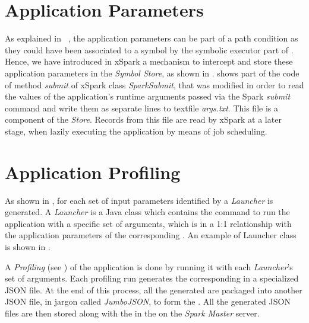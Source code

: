 \section{Application Parameters}\label{sec:application_parameters}
As explained in ~, the application parameters can be part of a path condition as they could have been associated to a symbol by the symbolic executor part of \dSymb. Hence, we have introduced in xSpark a mechanism to intercept and store these application parameters in the \tool \textit{Symbol Store}, as shown in .   shows part of the code of method \textit{submit} of xSpark class \textit{SparkSubmit}, that was modified in order to read the values of the application's runtime arguments passed via the Spark \textit{submit} command and write them as separate lines to textfile \textit{args.txt}. This file is a component of the \textit{\model Store}. Records from this file are read by xSpark at a later stage, when lazily executing the application by means of job scheduling.
 


\section{Application Profiling}\label{sec:application_profiling}
As shown in , for each set of input parameters identified by \dSymb a \textit{Launcher} is generated. A \textit{Launcher} is a Java class which contains the command to run the application with a specific set of arguments, which is in a 1:1 relationship with the application parameters of the corresponding \plan. An example of Launcher class is shown in . 

A \textit{Profiling} (see 
) of the application is done by running it with each \textit{Launcher}'s set of arguments. Each profiling run generates the corresponding \plan in a specialized JSON file. At the end of this process, all the generated \plans are packaged into another JSON file, in jargon called \textit{JumboJSON}, to form the \model. All the generated JSON files are then stored along with the \model in the \textit{} on the \textit{Spark Master} server. 



